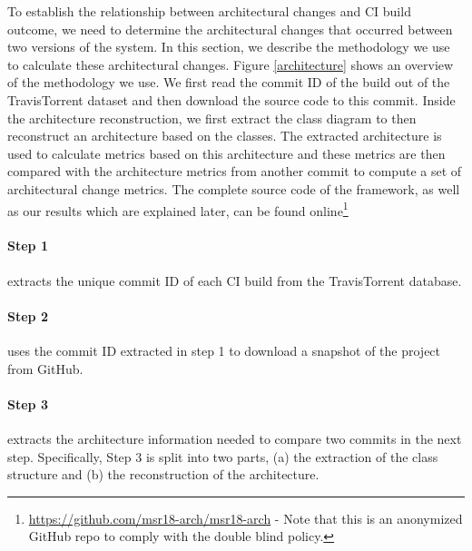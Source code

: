 \documentclass[sigplan, anonymous, review]{acmart}
\begin{document}


To establish the relationship between architectural changes and CI build outcome, we need to determine the architectural changes that occurred between two versions of the system.
In this section, we describe the methodology we use to calculate these architectural changes.
Figure \ref{architecture} shows an overview of the methodology we use.
We first read the commit ID of the build out of the TravisTorrent dataset and then download the source code to this commit. Inside the architecture reconstruction, we first extract the class diagram to then reconstruct an architecture based on the classes. 
The extracted architecture is used to calculate metrics based on this architecture and these metrics are then compared with the architecture metrics from another commit to compute a set of architectural change metrics.
The complete source code of the framework, as well as our results which are explained later, can be found online\footnote{\url{https://github.com/msr18-arch/msr18-arch} - Note that this is an anonymized GitHub repo to comply with the double blind policy.}
 
\paragraph{Step 1} extracts the unique commit ID of each CI build from the TravisTorrent database.

\paragraph{Step 2} uses the commit ID extracted in step 1 to download a snapshot of the project from GitHub.


\paragraph{Step 3} extracts the architecture information needed to compare two commits in the next step. 
Specifically, Step 3 is split into two parts, (a) the extraction of the class structure and (b) the reconstruction of the architecture. 
\end{document}
